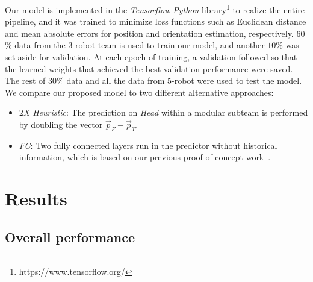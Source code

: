 \documentclass[letterpaper, 10 pt, conference]{ieeeconf}  %
\begin{document}
    Our model is implemented in the \emph{Tensorflow} \emph{Python}
    library\footnote{https://www.tensorflow.org/} to realize the entire
    pipeline, and it was trained to minimize loss functions such as
    Euclidean distance and mean absolute errors for position and
    orientation estimation, respectively. $60$\% data from the $3$-robot
    team is used to train our model, and another $10\%$ was set aside
    for validation. At each epoch of training, a validation followed so
    that the learned weights that achieved the best validation
    performance were saved. The rest of $30\%$ data and all the data
    from $5$-robot were used to test the model. We compare our proposed
    model to two different alternative approaches:
	\begin{itemize}
		\item \emph{$2$X Heuristic}:
            The prediction on \emph{Head} within a modular subteam is
            performed by doubling the vector $\vec{p}_{F} -
            \vec{p}_{T}$.

		\item \emph{FC}:
            Two fully connected layers run in the predictor without
            historical information, which is based on our previous
            proof-of-concept work~\cite{CPR17}.

	\end{itemize}

    \section{Results}
    \label{sec:results}

	\subsection{Overall performance}
	\label{sec:overall_performance}
\end{document}
